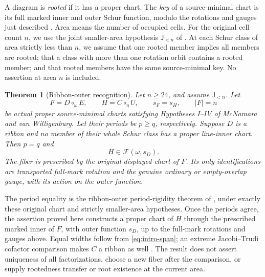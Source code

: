 \documentclass[11pt,a4paper]{amsart}
\numberwithin{equation}{section}
\theoremstyle{plain}
\newtheorem{theorem}{Theorem}[section]
\theoremstyle{definition}
\newcommand{\Jlower}{\mathsf J_{<n}}
\begin{document}
A diagram is \emph{rooted} if it has a proper chart.  The \emph{key}
of a source-minimal chart is its full marked inner and outer Schur
function, modulo the rotations and gauges just described
\cite{Shields2026Gluing}.  Area means the number of occupied cells.
For the original cell count \(n\), we use the joint smaller-area
hypothesis \(\Jlower\) of \cite{Shields2026RibbonPeriod}.
At each Schur class of area strictly less than \(n\), we assume that
one rooted member implies all members are rooted; that a class with
more than one rotation orbit contains a rooted member; and that
rooted members have the same source-minimal key.
No assertion at area \(n\) is included.

\begin{theorem}[Ribbon-outer recognition]\label{thm:recognition}
Let \(n\ge24\), and assume \(\Jlower\).  Let
\begin{equation}\label{eq:original-charts}
 F=D\circ_\omega E,\qquad H=C\circ_\eta U,\qquad
 s_F=s_H,\qquad |F|=n
\end{equation}
be actual proper source-minimal charts satisfying Hypotheses I--IV of
McNamara and van Willigenburg.
Let their periods be \(p\ge q\), respectively.  Suppose \(D\) is a
ribbon and no member of their whole Schur class has a proper line-inner
chart.  Then \(p=q\) and
\begin{equation}\label{eq:main-fiber}
 H\in\mathcal F(\omega,s_D).
\end{equation}
The fiber is prescribed by the original displayed chart of \(F\).
Its only identifications are transported full-mark rotation and the
genuine ordinary or empty-overlap gauge, with its action on the outer
function.
\end{theorem}

The period equality is the ribbon-outer period-rigidity theorem of
\cite{Shields2026RibbonPeriod}, under exactly these original chart and
strictly smaller-area hypotheses.  Once the periods agree, the assertion
proved here constructs a proper chart of \(H\) through the prescribed
marked inner of \(F\), with outer function \(s_D\), up to the full-mark
rotations and gauges above.  Equal widths follow from
\eqref{eq:intro-span}; an extreme Jacobi--Trudi cofactor comparison makes
\(C\) a ribbon as well \cite{Shields2026CornerDescent}.
The result does not assert uniqueness of all factorizations,
choose a new fiber after the comparison, or supply rootedness transfer or
root existence at the current area.
\end{document}
